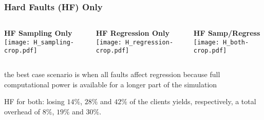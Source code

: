 \begin{frame}
\frametitle{Hard Faults (HF) Only}
%
\begin{columns}
\hspace{-1cm}
\begin{column}{0.33\textwidth}
\begin{center}
{\bf HF Sampling Only}\\
\vspace{0.15cm}
\texttt{[image: H\_sampling-crop.pdf]}
\end{center}
\end{column}
%
\begin{column}{0.33\textwidth}
\begin{center}
{\bf HF Regression Only }\\
\vspace{0.15cm}
\texttt{[image: H\_regression-crop.pdf]}
\end{center}
\end{column}
%
\begin{column}{0.33\textwidth}
\begin{center}
{\bf HF Samp/Regress}\\
\vspace{0.15cm}
\texttt{[image: H\_both-crop.pdf]}
\end{center}
\end{column}
\end{columns}
%
\vspace{0.1cm}
%
\begin{columns}
\begin{column}{1.1\textwidth}
\bi
\item the best case scenario is when all faults affect regression 
because full computational power is available for a longer part of the simulation
\item HF for both: losing $14 \%$, $28 \%$ and $42 \%$ 
of the clients yields, respectively, a total overhead 
of $8 \%$, $19 \%$ and $30 \%$. 
\ei
\end{column}
\end{columns}
%
\end{frame}




